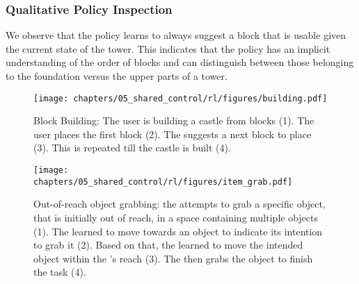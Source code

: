 \subsubsection*{Qualitative Policy Inspection} We observe that the policy learns to always suggest a block that is usable given the current state of the tower. This indicates that the policy has an implicit understanding of the order of blocks and can distinguish between those belonging to the foundation versus the upper parts of a tower.




\begin{figure}[!t]

        \centering
        \texttt{[image: chapters/05\_shared\_control/rl/figures/building.pdf]} %
        \caption{Block Building: The user is building a castle from blocks (1). The user places the first block (2). The \interfaceagent suggests a next block to place (3). This is repeated till the castle is built (4). }
        \label{fig:building}
\end{figure}
\begin{figure}[!t]
        \centering
        \texttt{[image: chapters/05\_shared\_control/rl/figures/item\_grab.pdf]} %
        \caption{Out-of-reach object grabbing: the \useragent attempts to grab a specific object, that is initially out of reach, in a space containing multiple objects (1). The \useragent learned to move towards an object to indicate its intention to grab it (2). Based on that, the \interfaceagent learned to move the intended object within the \useragent's reach (3). The \useragent then grabs the object to finish the task (4).}
        \label{fig:objectgrab}
\end{figure}

